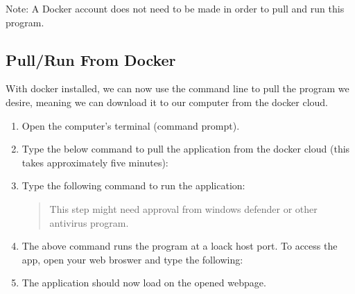 \documentclass[letterpaper,10pt,english]{sphinxmanual}
\begin{document}
\sphinxAtStartPar
Note: A Docker account does not need to be made in order to pull and run this
program.


\subsection{Pull/Run From Docker}
\label{\detokenize{pages/gettingStarted/docker:pull-run-from-docker}}
\sphinxAtStartPar
With docker installed, we can now use the command line to pull the program we
desire, meaning we can download it to our computer from the docker cloud.
\begin{enumerate}
%
\item {} 
\sphinxAtStartPar
Open the computer’s terminal (command prompt).

\item {} 
\sphinxAtStartPar
Type the below command to pull the application from the docker cloud (this
takes approximately five minutes):

\begin{sphinxVerbatim}[commandchars=\\\{\}]
  
\end{sphinxVerbatim}

\item {} 
\sphinxAtStartPar
Type the following command to run the application:
\begin{quote}

\begin{sphinxVerbatim}[commandchars=\\\{\}]
    
\end{sphinxVerbatim}

\sphinxAtStartPar
This step might need approval from windows defender or other antivirus
program.

\noindent{}
\end{quote}

\item {} 
\sphinxAtStartPar
The above command runs the program at a loack host port. To access
the app, open your web broswer and type the following:

\begin{sphinxVerbatim}[commandchars=\\\{\}]
\end{sphinxVerbatim}

\item {} 
\sphinxAtStartPar
The application should now load on the opened webpage.

\end{enumerate}
\end{document}
